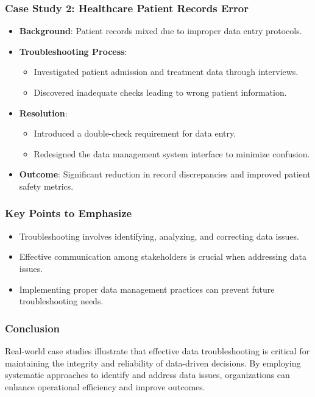 \documentclass{beamer}
\begin{document}
\begin{frame}[fragile]
    \frametitle{Case Study 2: Healthcare Patient Records Error}
    \begin{itemize}
        \item \textbf{Background}: Patient records mixed due to improper data entry protocols.
        \item \textbf{Troubleshooting Process}:
            \begin{itemize}
                \item Investigated patient admission and treatment data through interviews.
                \item Discovered inadequate checks leading to wrong patient information.
            \end{itemize}
        \item \textbf{Resolution}:
            \begin{itemize}
                \item Introduced a double-check requirement for data entry.
                \item Redesigned the data management system interface to minimize confusion.
            \end{itemize}
        \item \textbf{Outcome}: Significant reduction in record discrepancies and improved patient safety metrics.
    \end{itemize}
\end{frame}

\begin{frame}[fragile]
    \frametitle{Key Points to Emphasize}
    \begin{itemize}
        \item Troubleshooting involves identifying, analyzing, and correcting data issues.
        \item Effective communication among stakeholders is crucial when addressing data issues.
        \item Implementing proper data management practices can prevent future troubleshooting needs.
    \end{itemize}
\end{frame}

\begin{frame}[fragile]
    \frametitle{Conclusion}
    Real-world case studies illustrate that effective data troubleshooting is critical for maintaining the integrity and reliability of data-driven decisions. By employing systematic approaches to identify and address data issues, organizations can enhance operational efficiency and improve outcomes.
\end{frame}
\end{document}

